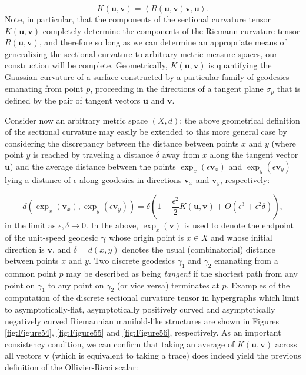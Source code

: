 \documentclass{article}
\begin{document}
\begin{equation}
K \left( \mathbf{u}, \mathbf{v} \right) = \left\langle R \left( \mathbf{u}, \mathbf{v} \right) \mathbf{v}, \mathbf{u} \right\rangle.
\end{equation}
Note, in particular, that the components of the sectional curvature tensor ${K \left( \mathbf{u}, \mathbf{v} \right)}$ completely determine the components of the Riemann curvature tensor ${R \left( \mathbf{u}, \mathbf{v} \right)}$, and therefore so long as we can determine an appropriate means of generalizing the sectional curvature to arbitrary metric-measure spaces, our construction will be complete. Geometrically, ${K \left( \mathbf{u}, \mathbf{v} \right)}$ is quantifying the Gaussian curvature of a surface constructed by a particular family of geodesics emanating from point $p$, proceeding in the directions of a tangent plane ${\sigma_p}$ that is defined by the pair of tangent vectors ${\mathbf{u}}$ and ${\mathbf{v}}$.

Consider now an arbitrary metric space ${\left( X, d \right)}$; the above geometrical definition of the sectional curvature may easily be extended to this more general case by considering the discrepancy between the distance between points $x$ and $y$ (where point $y$ is reached by traveling a distance ${\delta}$ away from $x$ along the tangent vector ${\mathbf{u}}$) and the average distance between the points ${\exp_x \left( \epsilon \mathbf{v}_x \right)}$ and ${\exp_y \left( \epsilon \mathbf{v}_y \right)}$ lying a distance of ${\epsilon}$ along geodesics in directions ${\mathbf{v}_x}$ and ${\mathbf{v}_y}$, respectively:

\begin{equation}
d \left( \exp_x \left( \mathbf{v}_x \right), \exp_y \left( \epsilon \mathbf{v}_y \right) \right) = \delta \left( 1 - \frac{\epsilon^2}{2} K \left( \mathbf{u}, \mathbf{v} \right) + O \left( \epsilon^3 + \epsilon^2 \delta \right) \right),
\end{equation}
in the limit as ${\epsilon, \delta \to 0}$. In the above, ${\exp_x \left( \mathbf{v} \right)}$ is used to denote the endpoint of the unit-speed geodesic ${\boldsymbol\gamma}$ whose origin point is ${x \in X}$ and whose initial direction is ${\mathbf{v}}$, and ${\delta = d \left( x, y \right)}$ denotes the usual (combinatorial) distance between points $x$ and $y$. Two discrete geodesics ${\gamma_1}$ and ${\gamma_2}$ emanating from a common point $p$ may be described as being \textit{tangent} if the shortest path from any point on ${\gamma_1}$ to any point on ${\gamma_2}$ (or vice versa) terminates at $p$. Examples of the computation of the discrete sectional curvature tensor in hypergraphs which limit to asymptotically-flat, asymptotically positively curved and asymptotically negatively curved Riemannian manifold-like structures are shown in Figures \ref{fig:Figure54}, \ref{fig:Figure55} and \ref{fig:Figure56}, respectively. As an important consistency condition, we can confirm that taking an average of ${K \left( \mathbf{u}, \mathbf{v} \right)}$ across all vectors ${\mathbf{v}}$ (which is equivalent to taking a trace) does indeed yield the previous definition of the Ollivier-Ricci scalar:
\end{document}
